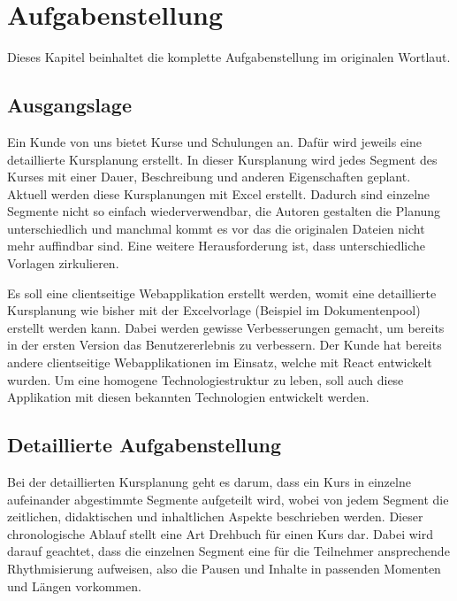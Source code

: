 \chapter{Aufgabenstellung}

Dieses Kapitel beinhaltet die komplette Aufgabenstellung im originalen Wortlaut.

\section{Ausgangslage}

Ein Kunde von uns bietet Kurse und Schulungen an. Dafür wird jeweils eine detaillierte Kursplanung erstellt. In dieser Kursplanung wird jedes Segment des Kurses mit einer Dauer, Beschreibung und anderen Eigenschaften geplant. Aktuell werden diese Kursplanungen mit Excel erstellt. Dadurch sind einzelne Segmente nicht so einfach wiederverwendbar, die Autoren gestalten die Planung unterschiedlich und manchmal kommt es vor das die originalen Dateien nicht mehr auffindbar sind. Eine weitere Herausforderung ist, dass unterschiedliche Vorlagen zirkulieren.

Es soll eine clientseitige Webapplikation erstellt werden, womit eine detaillierte Kursplanung wie bisher mit der Excelvorlage (Beispiel im Dokumentenpool) erstellt werden kann. Dabei werden gewisse Verbesserungen gemacht, um bereits in der ersten Version das Benutzererlebnis zu verbessern. Der Kunde hat bereits andere clientseitige Webapplikationen im Einsatz, welche mit React entwickelt wurden. Um eine homogene Technologiestruktur zu leben, soll auch diese Applikation mit diesen bekannten Technologien entwickelt werden.

\section{Detaillierte Aufgabenstellung}

Bei der detaillierten Kursplanung geht es darum, dass ein Kurs in einzelne aufeinander abgestimmte Segmente aufgeteilt wird, wobei von jedem Segment die zeitlichen, didaktischen und inhaltlichen Aspekte beschrieben werden. Dieser chronologische Ablauf stellt eine Art Drehbuch für einen Kurs dar. Dabei wird darauf geachtet, dass die einzelnen Segment eine für die Teilnehmer ansprechende Rhythmisierung  aufweisen, also die Pausen und Inhalte in passenden Momenten und Längen vorkommen.

